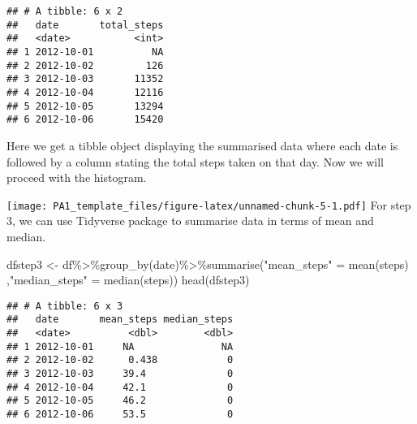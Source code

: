 \documentclass[
]{article}
\newenvironment{Shaded}{\begin{snugshade}}{\end{snugshade}}
\newcommand{\AttributeTok}[1]{\textcolor[rgb]{0.77,0.63,0.00}{#1}}
\newcommand{\FunctionTok}[1]{\textcolor[rgb]{0.00,0.00,0.00}{#1}}
\newcommand{\NormalTok}[1]{#1}
\newcommand{\OtherTok}[1]{\textcolor[rgb]{0.56,0.35,0.01}{#1}}
\newcommand{\SpecialCharTok}[1]{\textcolor[rgb]{0.00,0.00,0.00}{#1}}
\newcommand{\StringTok}[1]{\textcolor[rgb]{0.31,0.60,0.02}{#1}}
\begin{document}
\begin{verbatim}
## # A tibble: 6 x 2
##   date       total_steps
##   <date>           <int>
## 1 2012-10-01          NA
## 2 2012-10-02         126
## 3 2012-10-03       11352
## 4 2012-10-04       12116
## 5 2012-10-05       13294
## 6 2012-10-06       15420
\end{verbatim}

Here we get a tibble object displaying the summarised data where each
date is followed by a column stating the total steps taken on that day.
Now we will proceed with the histogram.

\begin{Shaded}
\end{Shaded}

\texttt{[image: PA1\_template\_files/figure-latex/unnamed-chunk-5-1.pdf]}
For step 3, we can use Tidyverse package to summarise data in terms of
mean and median.

\begin{Shaded}
\begin{Highlighting}[]
\NormalTok{dfstep3 }\OtherTok{\textless{}{-}}\NormalTok{ df}\SpecialCharTok{\%\textgreater{}\%}\FunctionTok{group\_by}\NormalTok{(date)}\SpecialCharTok{\%\textgreater{}\%}\FunctionTok{summarise}\NormalTok{(}\StringTok{"mean\_steps"} \OtherTok{=} \FunctionTok{mean}\NormalTok{(steps)}
\NormalTok{                                           ,}\StringTok{"median\_steps"} \OtherTok{=} \FunctionTok{median}\NormalTok{(steps))}
\FunctionTok{head}\NormalTok{(dfstep3)}
\end{Highlighting}
\end{Shaded}

\begin{verbatim}
## # A tibble: 6 x 3
##   date       mean_steps median_steps
##   <date>          <dbl>        <dbl>
## 1 2012-10-01     NA               NA
## 2 2012-10-02      0.438            0
## 3 2012-10-03     39.4              0
## 4 2012-10-04     42.1              0
## 5 2012-10-05     46.2              0
## 6 2012-10-06     53.5              0
\end{verbatim}
\end{document}
